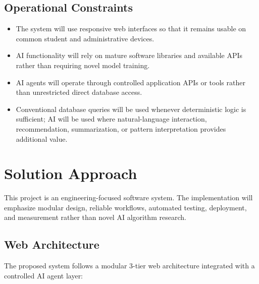 \documentclass[11pt,a4paper]{article}
\begin{document}
\subsection{Operational Constraints}
\begin{itemize}
    \item The system will use responsive web interfaces so that it remains usable on common student and administrative devices.
    \item AI functionality will rely on mature software libraries and available APIs rather than requiring novel model training.
    \item AI agents will operate through controlled application APIs or tools rather than unrestricted direct database access.
    \item Conventional database queries will be used whenever deterministic logic is sufficient; AI will be used where natural-language interaction, recommendation, summarization, or pattern interpretation provides additional value.
\end{itemize}

\section{Solution Approach}
This project is an engineering-focused software system. The implementation will emphasize modular design, reliable workflows, automated testing, deployment, and measurement rather than novel AI algorithm research.

\subsection{Web Architecture}
The proposed system follows a modular 3-tier web architecture integrated with a controlled AI agent layer:
\end{document}
